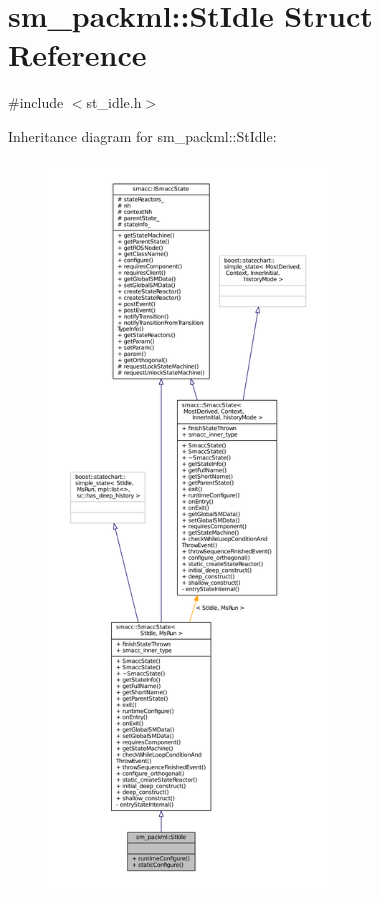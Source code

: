 \hypertarget{structsm__packml_1_1StIdle}{}\section{sm\+\_\+packml\+:\+:St\+Idle Struct Reference}
\label{structsm__packml_1_1StIdle}


{\ttfamily \#include $<$st\+\_\+idle.\+h$>$}



Inheritance diagram for sm\+\_\+packml\+:\+:St\+Idle\+:
\nopagebreak
\begin{figure}[H]
\begin{center}
\leavevmode
\includegraphics[height=550pt]{structsm__packml_1_1StIdle__inherit__graph}
\end{center}
\end{figure}


